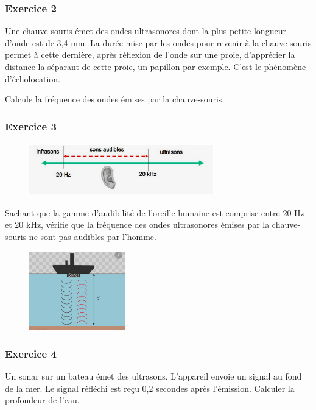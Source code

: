 \subsubsection*{Exercice 2}
  Une chauve-souris émet des ondes ultrasonores dont la plus petite
  longueur d'onde est de 3,4 mm. La durée mise par les ondes pour
  revenir à la chauve-souris permet à cette dernière, après réflexion de
  l'onde sur une proie, d'apprécier la distance la séparant de cette
  proie, un papillon par exemple. C'est le phénomène d'écholocation.

  Calcule la fréquence des ondes émises par la chauve-souris.

\subsubsection*{Exercice 3}

\begin{figure}
\centering
\includegraphics[width=7.996cm,height=2.281cm]{Pictures/10000001000001AC00000071A28062AB920FD735.png}
\caption{}
\end{figure}

  Sachant que la gamme d'audibilité de l'oreille humaine est comprise
  entre 20 Hz et 20 kHz, vérifie que la fréquence des ondes ultrasonores
  émises par la chauve-souris ne sont pas audibles par l'homme.

\begin{figure}
\centering
\includegraphics[width=4.186cm,height=3.41cm]{Pictures/1000000100000131000000F942C9C097631D2C4A.png}
\caption{}
\end{figure}

\subsubsection*{Exercice 4}

  Un sonar sur un bateau émet des ultrasons. L'appareil envoie un signal
  au fond de la mer. Le signal réfléchi est reçu 0,2 secondes après
  l'émission. Calculer la profondeur de l'eau.

